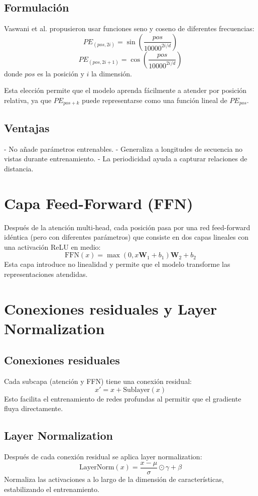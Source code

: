 \documentclass[12pt,a4paper,openany,oneside]{book}
\begin{document}
\subsection{Formulación}
Vaswani et al. propusieron usar funciones seno y coseno de diferentes frecuencias:
\[
PE_{(pos, 2i)} = \sin\left(\frac{pos}{10000^{2i/d}}\right)
\]
\[
PE_{(pos, 2i+1)} = \cos\left(\frac{pos}{10000^{2i/d}}\right)
\]
donde \(pos\) es la posición y \(i\) la dimensión.

Esta elección permite que el modelo aprenda fácilmente a atender por posición relativa, ya que \(PE_{pos+k}\) puede representarse como una función lineal de \(PE_{pos}\).

\subsection{Ventajas}
- No añade parámetros entrenables.
- Generaliza a longitudes de secuencia no vistas durante entrenamiento.
- La periodicidad ayuda a capturar relaciones de distancia.

\section{Capa Feed-Forward (FFN)}

Después de la atención multi-head, cada posición pasa por una red feed-forward idéntica (pero con diferentes parámetros) que consiste en dos capas lineales con una activación ReLU en medio:
\[
\text{FFN}(x) = \max(0, x\mathbf{W}_1 + b_1) \mathbf{W}_2 + b_2
\]
Esta capa introduce no linealidad y permite que el modelo transforme las representaciones atendidas.

\section{Conexiones residuales y Layer Normalization}

\subsection{Conexiones residuales}
Cada subcapa (atención y FFN) tiene una conexión residual:
\[
x' = x + \text{Sublayer}(x)
\]
Esto facilita el entrenamiento de redes profundas al permitir que el gradiente fluya directamente.

\subsection{Layer Normalization}
Después de cada conexión residual se aplica layer normalization:
\[
\text{LayerNorm}(x) = \frac{x - \mu}{\sigma} \odot \gamma + \beta
\]
Normaliza las activaciones a lo largo de la dimensión de características, estabilizando el entrenamiento.
\end{document}
